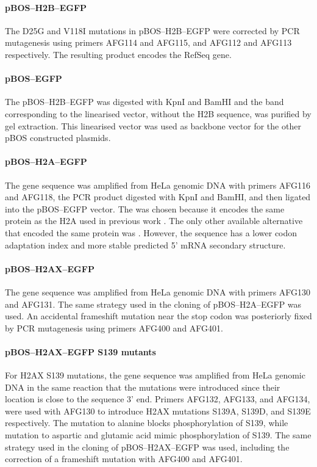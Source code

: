       \paragraph{pBOS--H2B--EGFP}
      The D25G and V118I mutations in pBOS--H2B--EGFP were corrected
      by PCR mutagenesis using primers AFG114 and AFG115, and AFG112
      and AFG113 respectively.  The resulting product encodes the
       RefSeq gene.

      \paragraph{pBOS--EGFP}
      The pBOS--H2B--EGFP was digested with KpnI and BamHI and the
      band corresponding to the linearised vector, without the H2B
      sequence, was purified by gel extraction.  This linearised vector
      was used as backbone vector for the other pBOS constructed
      plasmids.

      \paragraph{pBOS--H2A--EGFP}
      The  gene sequence was amplified from HeLa
      genomic DNA with primers AFG116 and AFG118, the PCR product
      digested with KpnI and BamHI, and then ligated into the
      pBOS--EGFP vector.  The  was chosen because it
      encodes the same protein as the H2A used in previous work
      \citep{flaus2004sin}.  The only other available alternative
      that encoded the same protein was .
      However, the  sequence has a lower codon
      adaptation index and more stable predicted 5' mRNA secondary structure.

      \paragraph{pBOS--H2AX--EGFP}
      The  gene sequence was amplified from HeLa genomic
      DNA with primers AFG130 and AFG131.  The same strategy used in
      the cloning of pBOS--H2A--EGFP was used.  An accidental
      frameshift mutation near the stop codon was posteriorly fixed by
      PCR mutagenesis using primers AFG400 and AFG401.

      \paragraph{pBOS--H2AX--EGFP S139 mutants}
      For H2AX S139 mutations, the  gene sequence was
      amplified from HeLa genomic DNA in the same reaction that the
      mutations were introduced since their location is close to the
      sequence 3' end.  Primers AFG132, AFG133, and AFG134, were used
      with AFG130 to introduce H2AX mutations S139A, S139D, and S139E
      respectively.  The mutation to alanine blocks phosphorylation of
      S139, while mutation to aspartic and glutamic acid mimic
      phosphorylation of S139.  The same strategy used in the cloning
      of pBOS--H2AX--EGFP was used, including the correction of a
      frameshift mutation with AFG400 and AFG401.

